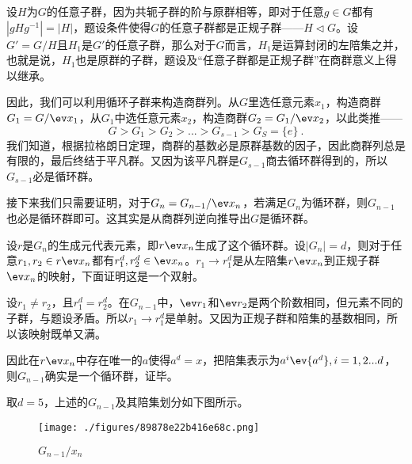 设$H$为$G$的任意子群，因为共轭子群的阶与原群相等，即对于任意$g\in G$都有$|gHg^{-1}|=|H|$，题设条件使得$G$的任意子群都是正规子群——$H\lhd G$。设$G'=G/H$且$H_1$是$G'$的任意子群，那么对于$G$而言，$H_1$是运算封闭的左陪集之并，也就是说，$H_1$也是原群的子群，题设及“任意子群都是正规子群”在商群意义上得以继承。

因此，我们可以利用循环子群来构造商群列。从$G$里选任意元素$x_1$，构造商群$G_1=G/\ev x_1$，从$G_1$中选任意元素$x_2$，构造商群$G_2=G_1/\ev x_2$，以此类推——
\begin{equation}
G>G_1>G_2>...>G_{s-1}>G_S=\{e\}~.
\end{equation}
我们知道，根据拉格朗日定理，商群的基数必是原群基数的因子，因此商群列总是有限的，最后终结于平凡群。又因为该平凡群是$G_{s-1}$商去循环群得到的，所以$G_{s-1}$必是循环群。

接下来我们只需要证明，对于$G_{n}=G_{n-1}/\ev x_n$，若满足$G_{n}$为循环群，则$G_{n-1}$也必是循环群即可。这其实是从商群列逆向推导出$G$是循环群。

设$r$是$G_n$的生成元代表元素，即$r\ev x_n$生成了这个循环群。设$|G_{n}|=d$，则对于任意$r_1,r_2\in r\ev x_n$都有$r_1^d,r_2^d\in\ev x_n$。$r_1\rightarrow r_1^d$是从左陪集$r\ev x_n$到正规子群$\ev x_n$的映射，下面证明这是一个双射。

设$r_1\neq r_2$，且$r_1^d=r_2^d$。在$G_{n-1}$中，$\ev r_1$和$\ev r_2$是两个阶数相同，但元素不同的子群，与题设矛盾。所以$r_1\rightarrow r_1^d$是单射。又因为正规子群和陪集的基数相同，所以该映射既单又满。

因此在$r\ev x_n$中存在唯一的$a$使得$a^d=x$，把陪集表示为$a^i\ev {a^d},i=1,2...d$，则$G_{n-1}$确实是一个循环群，证毕。

取$d=5$，上述的$G_{n-1}$及其陪集划分如下图所示。
\begin{figure}[ht]
\centering
\texttt{[image: ./figures/89878e22b416e68c.png]}
\caption{$G_{n-1}/x_n$} \label{fig_cyclic_2}
\end{figure}
